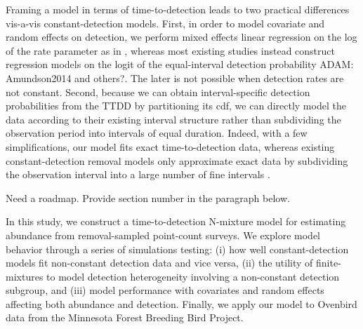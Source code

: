 \documentclass[useAMS,usenatbib,referee,12pt]{article}
\newcommand{\adam}[1]{{\color{blue} ADAM: #1}}
\newcommand{\jarad}[1]{{\color{Orange} #1}}
\begin{document}
Framing a model in terms of time-to-detection leads to two practical differences vis-a-vis constant-detection models.  
First, in order to model covariate and random effects on detection, we perform mixed effects linear regression on the log of the rate parameter as in \citet{Solymos2013}, whereas most existing studies instead construct regression models on the logit of the equal-interval detection probability \adam{Amundson2014 and others?}.  
The later is not possible when detection rates are not constant.  
Second, because we can obtain interval-specific detection probabilities from the TTDD by partitioning its cdf, we can directly model the data according to their existing interval structure rather than subdividing the observation period into intervals of equal duration.  
Indeed, with a few simplifications, our model fits exact time-to-detection data, whereas existing constant-detection removal models only approximate exact data by subdividing the observation interval into a large number of fine intervals \citep{Reidy2011, Amundson2014}.
% 

\jarad{Need a roadmap. Provide section number in the paragraph below.}

In this study, we construct a time-to-detection N-mixture model for estimating abundance from removal-sampled point-count surveys.  
We explore model behavior through a series of simulations testing: (i) how well constant-detection models fit non-constant detection data and vice versa, (ii) the utility of finite-mixtures to model detection heterogeneity involving a non-constant detection subgroup, and (iii) model performance with covariates and random effects affecting both abundance and detection.  
Finally, we apply our model to Ovenbird data from the Minnesota Forest Breeding Bird Project.
\end{document}
